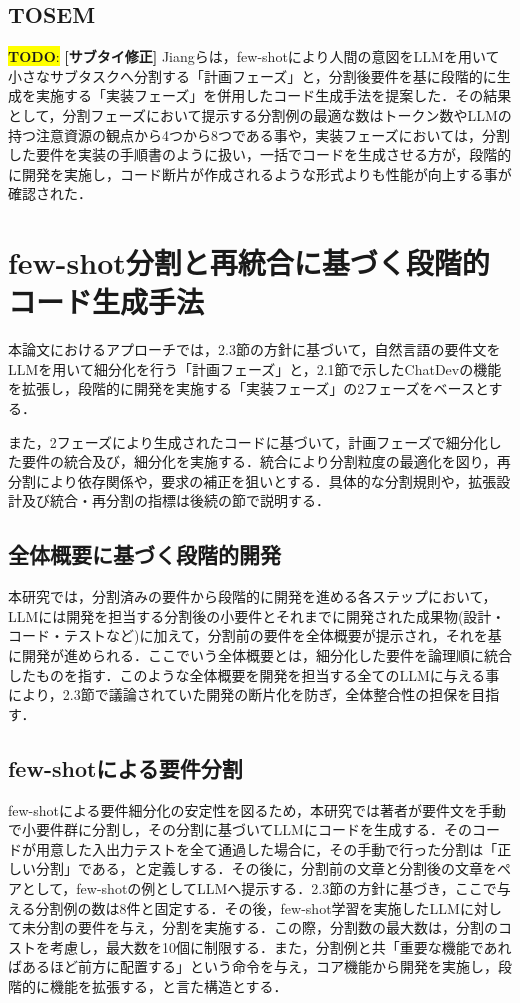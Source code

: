 \documentclass[submit,techrep,noauthor]{ipsj}
\newcommand{\todo}[1]{\colorbox{yellow}{{\bf TODO}:}{\color{red} {\textbf{[#1]}}}}
\begin{document}
\subsection{TOSEM}\todo{サブタイ修正}
Jiangら\cite{tosem}は，few-shotにより人間の意図をLLMを用いて小さなサブタスクへ分割する「計画フェーズ」と，分割後要件を基に段階的に生成を実施する「実装フェーズ」を併用したコード生成手法を提案した．その結果として，分割フェーズにおいて提示する分割例の最適な数はトークン数やLLMの持つ注意資源の観点から4つから8つである事や，実装フェーズにおいては，分割した要件を実装の手順書のように扱い，一括でコードを生成させる方が，段階的に開発を実施し，コード断片が作成されるような形式よりも性能が向上する事が確認された．


\section{few-shot分割と再統合に基づく段階的コード生成手法}
\label{sec:method}

本論文におけるアプローチでは，2.3節の方針に基づいて，自然言語の要件文をLLMを用いて細分化を行う「計画フェーズ」と，2.1節で示したChatDevの機能を拡張し，段階的に開発を実施する「実装フェーズ」の2フェーズをベースとする．

また，2フェーズにより生成されたコードに基づいて，計画フェーズで細分化した要件の統合及び，細分化を実施する．統合により分割粒度の最適化を図り，再分割により依存関係や，要求の補正を狙いとする．具体的な分割規則や，拡張設計及び統合・再分割の指標は後続の節で説明する．


\subsection{全体概要に基づく段階的開発}
本研究では，分割済みの要件から段階的に開発を進める各ステップにおいて，LLMには開発を担当する分割後の小要件とそれまでに開発された成果物(設計・コード・テストなど)に加えて，分割前の要件を全体概要が提示され，それを基に開発が進められる．ここでいう全体概要とは，細分化した要件を論理順に統合したものを指す．このような全体概要を開発を担当する全てのLLMに与える事により，2.3節で議論されていた開発の断片化を防ぎ，全体整合性の担保を目指す．

\subsection{few-shotによる要件分割}
few-shotによる要件細分化の安定性を図るため，本研究では著者が要件文を手動で小要件群に分割し，その分割に基づいてLLMにコードを生成する．そのコードが用意した入出力テストを全て通過した場合に，その手動で行った分割は「正しい分割」である，と定義しする．その後に，分割前の文章と分割後の文章をペアとして，few-shotの例としてLLMへ提示する．2.3節の方針に基づき，ここで与える分割例の数は8件と固定する．その後，few-shot学習を実施したLLMに対して未分割の要件を与え，分割を実施する．この際，分割数の最大数は，分割のコストを考慮し，最大数を10個に制限する．また，分割例と共「重要な機能であればあるほど前方に配置する」という命令を与え，コア機能から開発を実施し，段階的に機能を拡張する，と言た構造とする．
\end{document}
